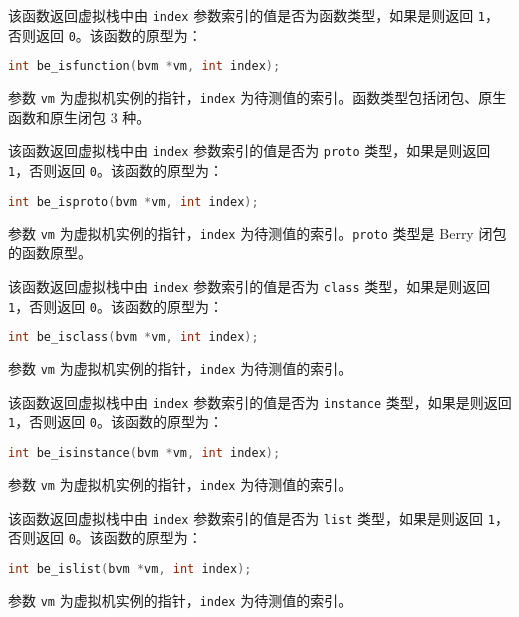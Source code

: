 
该函数返回虚拟栈中由 \texttt{index} 参数索引的值是否为函数类型，如果是则返回 \texttt{1}，否则返回 \texttt{0}。该函数的原型为：
\begin{lstlisting}[language=c, style=berry, numbers=none]
int be_isfunction(bvm *vm, int index);
\end{lstlisting}
参数 \texttt{vm} 为虚拟机实例的指针，\texttt{index} 为待测值的索引。函数类型包括闭包、原生函数和原生闭包 3 种。


该函数返回虚拟栈中由 \texttt{index} 参数索引的值是否为 \texttt{proto} 类型，如果是则返回 \texttt{1}，否则返回 \texttt{0}。该函数的原型为：
\begin{lstlisting}[language=c, style=berry, numbers=none]
int be_isproto(bvm *vm, int index);
\end{lstlisting}
参数 \texttt{vm} 为虚拟机实例的指针，\texttt{index} 为待测值的索引。\texttt{proto} 类型是 Berry 闭包的函数原型。


该函数返回虚拟栈中由 \texttt{index} 参数索引的值是否为 \texttt{class} 类型，如果是则返回 \texttt{1}，否则返回 \texttt{0}。该函数的原型为：
\begin{lstlisting}[language=c, style=berry, numbers=none]
int be_isclass(bvm *vm, int index);
\end{lstlisting}
参数 \texttt{vm} 为虚拟机实例的指针，\texttt{index} 为待测值的索引。


该函数返回虚拟栈中由 \texttt{index} 参数索引的值是否为 \texttt{instance} 类型，如果是则返回 \texttt{1}，否则返回 \texttt{0}。该函数的原型为：
\begin{lstlisting}[language=c, style=berry, numbers=none]
int be_isinstance(bvm *vm, int index);
\end{lstlisting}
参数 \texttt{vm} 为虚拟机实例的指针，\texttt{index} 为待测值的索引。


该函数返回虚拟栈中由 \texttt{index} 参数索引的值是否为 \texttt{list} 类型，如果是则返回 \texttt{1}，否则返回 \texttt{0}。该函数的原型为：
\begin{lstlisting}[language=c, style=berry, numbers=none]
int be_islist(bvm *vm, int index);
\end{lstlisting}
参数 \texttt{vm} 为虚拟机实例的指针，\texttt{index} 为待测值的索引。

